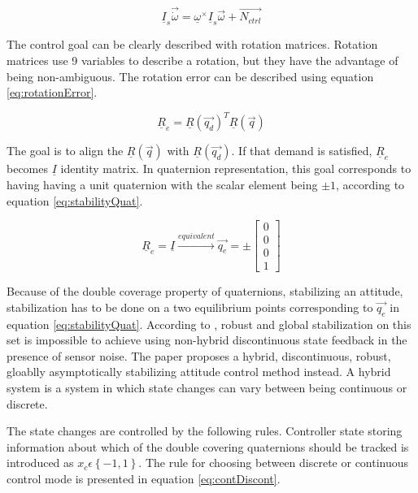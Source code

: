 \begin{equation}
\label{eq:dynSimple}
\underline{I}_s \vec{\dot{\omega}} = \underline{\omega}^\times \underline{I}_s \vec{\omega} + \vec{N_{ctrl}}
\end{equation}

The control goal can be clearly described with rotation matrices. Rotation matrices use 9 variables to describe a rotation, but they have the advantage of being non-ambiguous. The rotation error can be described using equation \ref{eq:rotationError}. 

\begin{equation}
\label{eq:rotationError}
\underline{R}_e = \underline{R}(\vec{q_d})^T \underline{R}(\vec{q})
\end{equation}

The goal is to align the $\underline{R}(\vec{q})$ with $\underline{R}(\vec{q_d})$. If that demand is satisfied, $\underline{R}_e$ becomes $\underline{I}$ identity matrix. In quaternion representation, this goal corresponds to having having a unit quaternion with the scalar element being $\pm 1$, according to equation \ref{eq:stabilityQuat}. 

\begin{equation}
\label{eq:stabilityQuat}
\underline{R}_e = \underline{I} \xrightarrow{equivalent} \vec{q_e}  = \pm	\begin{bmatrix}
0 \\
0 \\
0 \\
1
\end{bmatrix} 	
\end{equation}

Because of the double coverage property of quaternions, stabilizing an attitude, stabilization has to be done on a two equilibrium points corresponding to $\vec{q_e}$ in equation \ref{eq:stabilityQuat}. According to \cite{globalAttController}, robust and global stabilization on this set is impossible to achieve using non-hybrid discontinuous state feedback in the presence of sensor noise. The paper proposes a hybrid, discontinuous, robust, gloablly asymptotically stabilizing attitude control method instead. A hybrid system is a system in which state changes can vary between being continuous or discrete.

The state changes are controlled by the following rules. Controller state storing information about which of the double covering quaternions should be tracked is introduced as $x_c \epsilon  \left\lbrace -1,1 \right\rbrace $. The rule for choosing between discrete or continuous control mode is presented in equation \ref{eq:contDiscont}.

